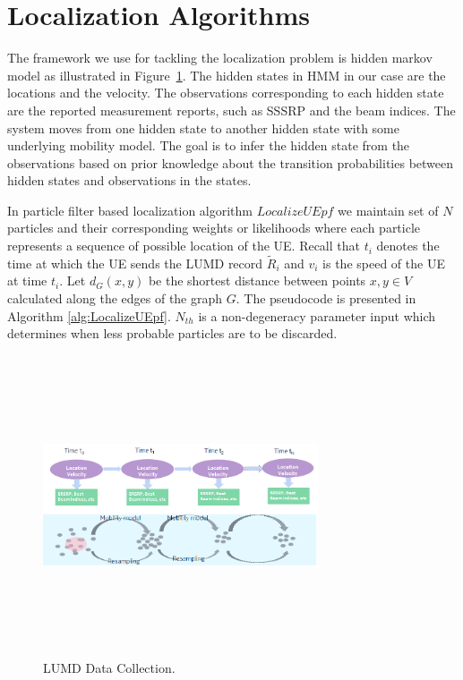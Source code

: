 \documentclass[conference, 10pt]{IEEEtran}
\begin{document}
\section{Localization Algorithms}
\label{sec:localalgo}

The framework we use for tackling the localization problem is hidden markov model as illustrated 
in Figure~\ref{fig:hmm_particle}. The hidden states in HMM in our case are the locations and the velocity. 
The observations corresponding to each hidden state are the reported measurement reports, such as SSSRP and the beam indices.
The system moves from one hidden state to another hidden state with some underlying mobility model. 
The goal is to infer the hidden state from the observations based on
prior knowledge about the transition probabilities between hidden states and
observations in the states.

 In particle filter based localization algorithm $LocalizeUEpf$ we maintain set
 of $N$ particles and their corresponding weights or likelihoods where each
 particle represents a sequence of possible location of the UE. Recall that $t_i$
 denotes the time at which the UE sends the LUMD record $\tilde{R}_i$ and $v_i$ is
 the speed of the UE at time $t_i.$ Let $d_G(x,y)$ be the shortest distance
 between points $x,y \in V$ calculated along the edges of the graph $G.$ The
 pseudocode is presented in Algorithm \ref{alg:LocalizeUEpf}. $N_{th}$ is a
 non-degeneracy parameter input which determines when less probable particles are
 to be discarded. 

\begin{figure}[t]
	\begin{center}
	\includegraphics[height=3.5in,width=3.2in]{./HMM_ParticleFilter_Illustration.png}
	\caption{\label{fig:hmm_particle}
	{\small LUMD Data Collection.}}
	\end{center}
	\end{figure}
\end{document}

